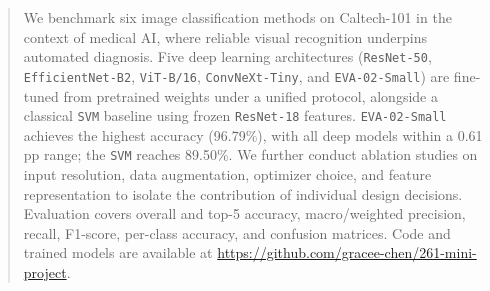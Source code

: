 \begin{abstract}
We benchmark six image classification methods on Caltech-101 in the context of medical AI, where reliable visual recognition underpins automated diagnosis. Five deep learning architectures (\texttt{ResNet-50}, \texttt{EfficientNet-B2}, \texttt{ViT-B/16}, \texttt{ConvNeXt-Tiny}, and \texttt{EVA-02-Small}) are fine-tuned from pretrained weights under a unified protocol, alongside a classical \texttt{SVM} baseline using frozen \texttt{ResNet-18} features. \texttt{EVA-02-Small} achieves the highest accuracy (96.79\%), with all deep models within a 0.61\,pp range; the \texttt{SVM} reaches 89.50\%. We further conduct ablation studies on input resolution, data augmentation, optimizer choice, and feature representation to isolate the contribution of individual design decisions. Evaluation covers overall and top-5 accuracy, macro/weighted precision, recall, F1-score, per-class accuracy, and confusion matrices. Code and trained models are available at \url{https://github.com/gracee-chen/261-mini-project}.
\end{abstract}
